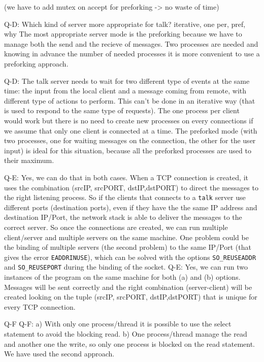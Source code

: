 (we have to add mutex on accept for preforking -> no waste of time)

Q-D: Which kind of server more appropriate for talk? iterative, one per, pref, why
The most appropriate server mode is the preforking because we have to manage both the send and the recieve of messages. Two processes are needed and knowing in advance the number of needed processes it is more convenient to use a preforking approach.


Q-D: The talk server needs to wait for two different type of events at the same time: the input from the local client and a message coming from remote, with different type of actions to perform. This can't be done in an iterative way (that is used to respond to the same type of requests). The one process per client would work but there is no need to create new processes on every connections if we assume that only one client is connected at a time. The preforked mode (with two processes, one for waiting messages on the connection, the other for the user input) is ideal for this situation, because all the preforked processes are used to their maximum.

Q-E: Yes, we can do that in both cases. When a TCP connection is created, it uses the combination (srcIP, srcPORT, dstIP,dstPORT) to direct the messages to the right listening process. So if the clients that connects to a \texttt{talk} server use different ports (destination ports), even if they have the the same IP address and destination IP/Port, the network stack is able to deliver the messages to the correct server. So once the connections are created, we can run multiple client/server and multiple servers on the same machine. One problem could be the binding of multiple servers (the second problem) to the same IP/Port (that gives the error \texttt{EADDRINUSE}), which can be solved with the options \texttt{SO\_REUSEADDR} and \texttt{SO\_REUSEPORT} during the binding of the socket.
Q-E: Yes, we can run two instances of the program on the same machine for both (a) and (b) options. Messages will be sent correctly and the right combination (server-client) will be created looking on the tuple (srcIP, srcPORT, dstIP,dstPORT) that is unique for every TCP connection.

Q-F
Q-F: a) With only one process/thread it is possible to use the select statement to avoid the blocking read. 
b) One process/thread manage the read and another one the write, so only one process is blocked on the read statement.
We have used the second approach.


